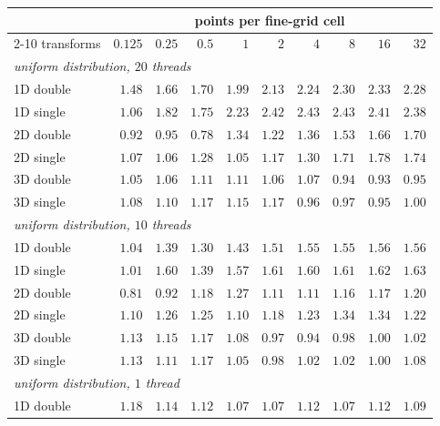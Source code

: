 \begin{table}[p]
    \centering
    \footnotesize
    \setlength{\tabcolsep}{4pt}
    \begin{tabular}{lrrrrrrrrr}
        \toprule
        & \multicolumn{9}{c}{points per fine-grid cell} \\
        \cmidrule(lr){2-10}
        transforms & $0.125$ & $0.25$ & $0.5$ & $1$ & $2$ & $4$ & $8$ & $16$ & $32$ \\
        \midrule
        \multicolumn{10}{l}{\emph{uniform distribution, $20$ threads}} \\
        1D double & $1.48$ & $1.66$ & $1.70$ & $1.99$ & $2.13$ & $2.24$ & $2.30$ & $2.33$ & $2.28$ \\
        1D single & $1.06$ & $1.82$ & $1.75$ & $2.23$ & $2.42$ & $2.43$ & $2.43$ & $2.41$ & $2.38$ \\
        2D double & $0.92$ & $0.95$ & $0.78$ & $1.34$ & $1.22$ & $1.36$ & $1.53$ & $1.66$ & $1.70$ \\
        2D single & $1.07$ & $1.06$ & $1.28$ & $1.05$ & $1.17$ & $1.30$ & $1.71$ & $1.78$ & $1.74$ \\
        3D double & $1.05$ & $1.06$ & $1.11$ & $1.11$ & $1.06$ & $1.07$ & $0.94$ & $0.93$ & $0.95$ \\
        3D single & $1.08$ & $1.10$ & $1.17$ & $1.15$ & $1.17$ & $0.96$ & $0.97$ & $0.95$ & $1.00$ \\
        \midrule
        \multicolumn{10}{l}{\emph{uniform distribution, $10$ threads}} \\
        1D double & $1.04$ & $1.39$ & $1.30$ & $1.43$ & $1.51$ & $1.55$ & $1.55$ & $1.56$ & $1.56$ \\
        1D single & $1.01$ & $1.60$ & $1.39$ & $1.57$ & $1.61$ & $1.60$ & $1.61$ & $1.62$ & $1.63$ \\
        2D double & $0.81$ & $0.92$ & $1.18$ & $1.27$ & $1.11$ & $1.11$ & $1.16$ & $1.17$ & $1.20$ \\
        2D single & $1.10$ & $1.26$ & $1.25$ & $1.10$ & $1.18$ & $1.23$ & $1.34$ & $1.34$ & $1.22$ \\
        3D double & $1.13$ & $1.15$ & $1.17$ & $1.08$ & $0.97$ & $0.94$ & $0.98$ & $1.00$ & $1.02$ \\
        3D single & $1.13$ & $1.11$ & $1.17$ & $1.05$ & $0.98$ & $1.02$ & $1.02$ & $1.00$ & $1.08$ \\
        \midrule
        \multicolumn{10}{l}{\emph{uniform distribution, $1$ thread}} \\
        1D double & $1.18$ & $1.14$ & $1.12$ & $1.07$ & $1.07$ & $1.12$ & $1.07$ & $1.12$ & $1.09$ \\

\end{tabular}
\end{table}
